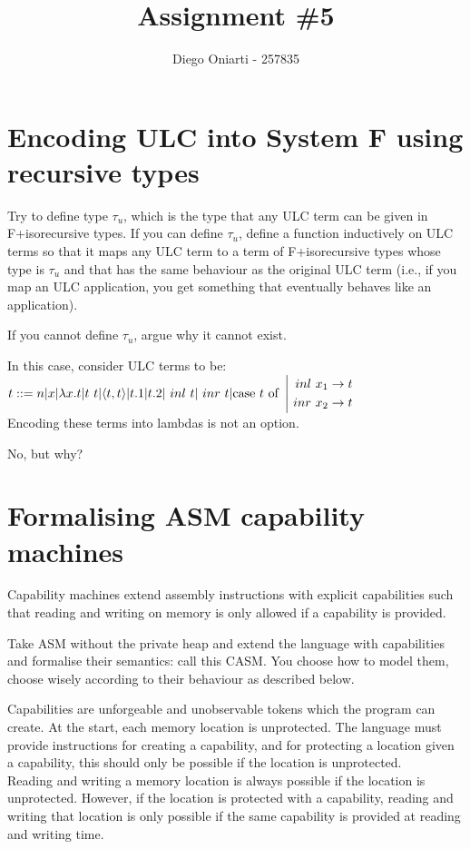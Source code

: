 \documentclass{article}
\title{Assignment \#5}
\author{Diego Oniarti - 257835}
\date{}
\begin{document}
\maketitle

\section{Encoding ULC into System F using recursive types}
Try to define type $\tau_u$, which is the type that any ULC term can be given in F+isorecursive types. If you can define $\tau_u$, define a function inductively on ULC terms so that it maps any ULC term to a term of F+isorecursive types whose type is $\tau_u$ and that has the same behaviour as the original ULC term (i.e., if you map an ULC application, you get something that eventually behaves like an application).

If you cannot define $\tau_u$, argue why it cannot exist.

In this case, consider ULC terms to be: $t ::= n | x | \lambda x.t | t\ t | \langle t, t\rangle | t.1 | t.2 | \ inl\  t | \ inr\  t | \text{case}\ t\ \text{of}\ \left|\begin{aligned}\ inl\  x_1 \to t\\\ inr\  x_2 \to t\end{aligned}\right.$ \\
Encoding these terms into lambdas is not an option.

\hline

No, but why?

\newpage
\section{Formalising ASM capability machines}
Capability machines extend assembly instructions with explicit capabilities such that reading and writing on memory is only allowed if a capability is provided.

Take ASM without the private heap and extend the language with capabilities and formalise their semantics: call this CASM. You choose how to model them, choose wisely according to their behaviour as described below.

Capabilities are unforgeable and unobservable tokens which the program can create. At the start, each memory location is unprotected. The language must provide instructions for creating a capability, and for protecting a location given a capability, this should only be possible if the location is unprotected. \\
Reading and writing a memory location is always possible if the location is unprotected. However, if the location is protected with a capability, reading and writing that location is only possible if the same capability is provided at reading and writing time.
\end{document}
